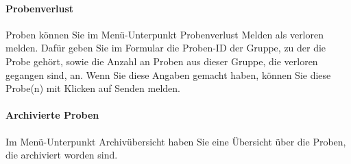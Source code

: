 \documentclass[enabledeprecatedfontcommands,fontsize=12pt,paper=a4,twoside]{scrartcl}
\begin{document}
\paragraph{Probenverlust}
Proben können Sie im Menü-Unterpunkt Probenverlust Melden als verloren melden. Dafür geben Sie im Formular die Proben-ID der Gruppe, zu der die Probe gehört, sowie die Anzahl an Proben aus dieser Gruppe, die verloren gegangen sind, an. Wenn Sie diese Angaben gemacht haben, können Sie diese Probe(n) mit Klicken auf Senden melden. \\

\paragraph{Archivierte Proben}
Im Menü-Unterpunkt Archivübersicht haben Sie eine Übersicht über die Proben, die archiviert worden sind. \\
\end{document}
